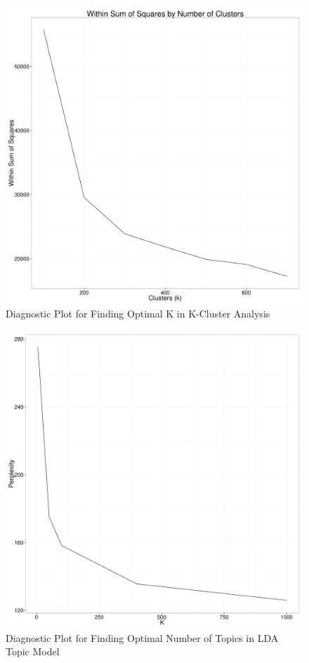 \documentclass[11pt,article,oneside]{memoir}
\makeatletter
\def\maxwidth{\ifdim\Gin@nat@width>\linewidth\linewidth
\else\Gin@nat@width\fi}
\let\Oldincludegraphics\includegraphics
\renewcommand{\includegraphics}[1]{\Oldincludegraphics[width=\maxwidth]{#1}}
\makeatother
\begin{document}
\begin{figure}[htbp]
\centering
\includegraphics{figure/Cluster-Diagnostics.pdf}
\caption{Diagnostic Plot for Finding Optimal K in K-Cluster Analysis}
\end{figure}

\begin{figure}[htbp]
\centering
\includegraphics{figure/LDA-Diagnostics.pdf}
\caption{Diagnostic Plot for Finding Optimal Number of Topics in LDA
Topic Model}
\end{figure}
\end{document}
